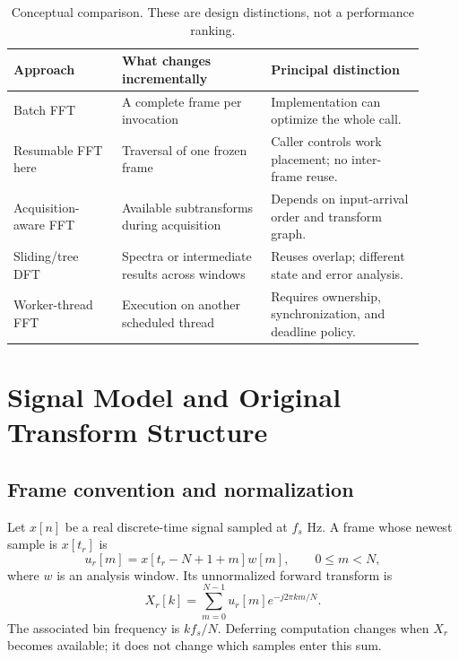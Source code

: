 \documentclass[11pt,letterpaper]{article}
\begin{document}
\begin{table}[tb]
\centering\small
\begin{tabular}{@{}>{\raggedright\arraybackslash}p{0.24\linewidth}>{\raggedright\arraybackslash}p{0.33\linewidth}>{\raggedright\arraybackslash}p{0.34\linewidth}@{}}
\toprule
Approach & What changes incrementally & Principal distinction \\
\midrule
Batch FFT & A complete frame per invocation & Implementation can optimize the whole call. \\
Resumable FFT here & Traversal of one frozen frame & Caller controls work placement; no inter-frame reuse. \\
Acquisition-aware FFT & Available subtransforms during acquisition & Depends on input-arrival order and transform graph. \\
Sliding/tree DFT & Spectra or intermediate results across windows & Reuses overlap; different state and error analysis. \\
Worker-thread FFT & Execution on another scheduled thread & Requires ownership, synchronization, and deadline policy. \\
\bottomrule
\end{tabular}
\caption{Conceptual comparison. These are design distinctions, not a performance ranking.}
\label{tab:position}
\end{table}

\section{Signal Model and Original Transform Structure}
\label{sec:legacy-transform}
\subsection{Frame convention and normalization}
Let $x[n]$ be a real discrete-time signal sampled at $f_s$ Hz. A frame whose
newest sample is $x[t_r]$ is
\begin{equation}
 u_r[m]=x[t_r-N+1+m]w[m],\qquad 0\le m<N,
\end{equation}
where $w$ is an analysis window. Its unnormalized forward transform is
\begin{equation}
 X_r[k]=\sum_{m=0}^{N-1}u_r[m]e^{-j2\pi km/N}.
 \label{eq:dft}
\end{equation}
The associated bin frequency is $kf_s/N$. Deferring computation changes when
$X_r$ becomes available; it does not change which samples enter this sum.
\end{document}
